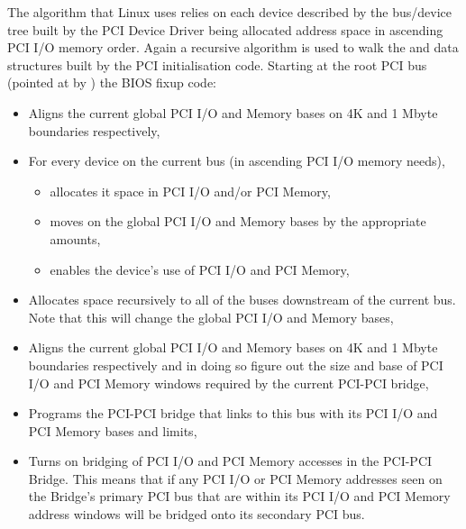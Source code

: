The algorithm that Linux uses relies on each device described 
by the bus/device tree built by the PCI Device Driver being 
allocated address space in ascending PCI I/O memory order.   
Again a recursive algorithm is used to walk the  and  
data structures built by the PCI initialisation code.
Starting at the root PCI bus (pointed at by ) the BIOS fixup
code:
\begin{itemize}
\item Aligns the current global PCI I/O and Memory bases on 4K 
   and 1 Mbyte boundaries respectively,

\item For every device on the current bus (in ascending PCI I/O 
   memory needs), 
	\begin{itemize}
	\item     allocates it space in PCI I/O and/or PCI Memory,

 	\item    moves on the global PCI I/O and Memory bases by the 
        appropriate amounts,

 	\item    enables the device's use of PCI I/O and PCI Memory,
	\end{itemize}

\item Allocates space recursively to all of the buses 
   downstream of the current bus.  Note that this will 
   change the global PCI I/O and Memory bases,

\item Aligns the current global PCI I/O and Memory bases on 4K 
   and 1 Mbyte boundaries respectively and in doing so 
   figure out the size and base of PCI I/O and PCI Memory 
   windows required by the current PCI-PCI bridge,

\item Programs the PCI-PCI bridge that links to this bus with 
   its PCI I/O and PCI Memory bases and limits,

\item Turns on bridging of PCI I/O and PCI Memory accesses in
	 the PCI-PCI Bridge.  This means that if any PCI I/O or PCI Memory
	 addresses seen on the Bridge's primary PCI bus that are within
	its PCI I/O and PCI Memory address windows will be bridged onto
	its secondary PCI bus.
\end{itemize}

